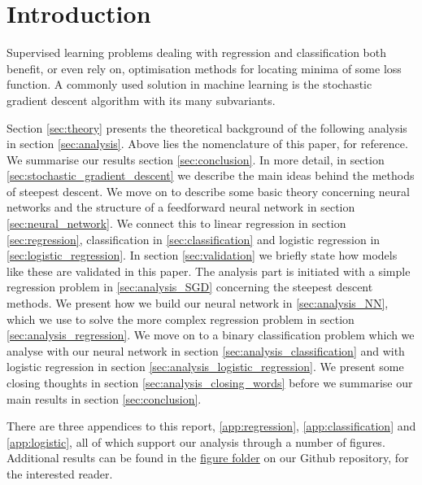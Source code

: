 \section{Introduction}\label{sec:introduction}


Supervised learning problems dealing with regression and classification both benefit, or even rely on, optimisation methods for locating minima of some loss function. A commonly used solution in machine learning is the stochastic gradient descent algorithm with its many subvariants. 


\fillertext


Section \ref{sec:theory} presents the theoretical background of the following analysis in section \ref{sec:analysis}. Above lies the nomenclature of this paper, for reference. We summarise our results section \ref{sec:conclusion}. In more detail, in section \ref{sec:stochastic_gradient_descent} we describe the main ideas behind the methods of steepest descent. We move on to describe some basic theory concerning neural networks and the structure of a feedforward neural network in section \ref{sec:neural_network}. We connect this to linear regression in section \ref{sec:regression}, classification in \ref{sec:classification} and logistic regression in \ref{sec:logistic_regression}. In section \ref{sec:validation} we briefly state how models like these are validated in this paper. The analysis part is initiated with a simple regression problem in \ref{sec:analysis_SGD} concerning the steepest descent methods. We present how we build our neural network in \ref{sec:analysis_NN}, which we use to solve the more complex regression problem in section \ref{sec:analysis_regression}. We move on to a binary classification problem which we analyse with our neural network in section \ref{sec:analysis_classification} and with logistic regression in section \ref{sec:analysis_logistic_regression}. We present some closing thoughts  in section \ref{sec:analysis_closing_words} before we summarise our main results in section \ref{sec:conclusion}.

There are three appendices to this report, \ref{app:regression}, \ref{app:classification} and \ref{app:logistic}, all of which support our analysis through a number of figures. Additional results can be found in the \href{\figureslink}{figure folder} on our Github repository, for the interested reader.